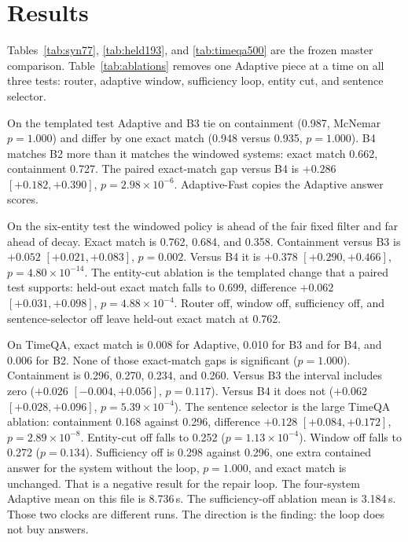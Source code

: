 \documentclass[sigconf,anonymous,review]{acmart}
\begin{document}
\section{Results}

Tables~\ref{tab:syn77}, \ref{tab:held193}, and \ref{tab:timeqa500} are the frozen master comparison.
Table~\ref{tab:ablations} removes one Adaptive piece at a time on all three tests: router, adaptive window, sufficiency loop, entity cut, and sentence selector.



On the templated test Adaptive and B3 tie on containment (0.987, McNemar $p=1.000$) and differ by one exact match (0.948 versus 0.935, $p=1.000$).
B4 matches B2 more than it matches the windowed systems: exact match 0.662, containment 0.727.
The paired exact-match gap versus B4 is $+0.286$ $[+0.182,+0.390]$, $p=2.98\times 10^{-6}$.
Adaptive-Fast copies the Adaptive answer scores.

On the six-entity test the windowed policy is ahead of the fair fixed filter and far ahead of decay.
Exact match is 0.762, 0.684, and 0.358.
Containment versus B3 is $+0.052$ $[+0.021,+0.083]$, $p=0.002$.
Versus B4 it is $+0.378$ $[+0.290,+0.466]$, $p=4.80\times 10^{-14}$.
The entity-cut ablation is the templated change that a paired test supports: held-out exact match falls to 0.699, difference $+0.062$ $[+0.031,+0.098]$, $p=4.88\times 10^{-4}$.
Router off, window off, sufficiency off, and sentence-selector off leave held-out exact match at 0.762.

On TimeQA, exact match is 0.008 for Adaptive, 0.010 for B3 and for B4, and 0.006 for B2.
None of those exact-match gaps is significant ($p=1.000$).
Containment is 0.296, 0.270, 0.234, and 0.260.
Versus B3 the interval includes zero ($+0.026$ $[-0.004,+0.056]$, $p=0.117$).
Versus B4 it does not ($+0.062$ $[+0.028,+0.096]$, $p=5.39\times 10^{-4}$).
The sentence selector is the large TimeQA ablation: containment 0.168 against 0.296, difference $+0.128$ $[+0.084,+0.172]$, $p=2.89\times 10^{-8}$.
Entity-cut off falls to 0.252 ($p=1.13\times 10^{-4}$).
Window off falls to 0.272 ($p=0.134$).
Sufficiency off is 0.298 against 0.296, one extra contained answer for the system without the loop, $p=1.000$, and exact match is unchanged.
That is a negative result for the repair loop.
The four-system Adaptive mean on this file is 8.736\,s.
The sufficiency-off ablation mean is 3.184\,s.
Those two clocks are different runs.
The direction is the finding: the loop does not buy answers.
\end{document}
